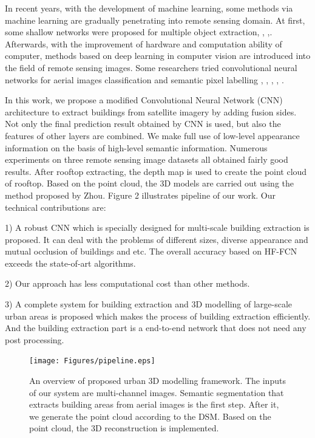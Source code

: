 In recent years, with the development of machine learning, some methods via machine learning are gradually penetrating into remote sensing domain. At first, some shallow networks were proposed for multiple object extraction\cite{IEEEexample:mnih2013machine}, \cite{IEEEexample:saito2016multiple}, \cite{IEEEexample:alshehhi2017simultaneous},\cite{IEEEexample:zhao2017contextually}. Afterwards, with the improvement of hardware and computation ability of computer, methods based on deep learning in computer vision are introduced into the field of remote sensing images. Some researchers tried convolutional neural networks for aerial images classification and semantic pixel labelling \cite{IEEEexample:paisitkriangkrai2015effective}, \cite{IEEEexample:liu2017dense}, \cite{IEEEexample:audebert2017deep}, \cite{IEEEexample:kampffmeyer2017urban}, \cite{IEEEexample:he2017multi}.\par
In this work, we propose a modified Convolutional Neural Network (CNN) architecture to extract buildings from satellite imagery by adding fusion sides. Not only the final prediction result obtained by CNN is used, but also the features of other layers are combined. We make full use of low-level appearance information on the basis of high-level semantic information. Numerous experiments on three remote sensing image datasets all obtained fairly good results. After rooftop extracting, the depth map is used to create the point cloud of rooftop. Based on the point cloud, the 3D models are carried out using the method proposed by Zhou\cite{IEEEexample:zhou20112}. Figure 2 illustrates pipeline of our work. Our technical contributions are:\par
 1) A robust CNN which is specially designed for multi-scale building extraction is proposed. It can deal with the problems of different sizes, diverse appearance and mutual occlusion of buildings and etc. The overall accuracy based on HF-FCN exceeds the state-of-art algorithms.\par
 2) Our approach has less computational cost than other methods.\par
 3) A complete system for building extraction and 3D modelling of large-scale urban areas is proposed which makes the process of building extraction efficiently. And the building extraction part is a end-to-end network that does not need any post processing.
\begin{center}
\begin{figure}
\texttt{[image: Figures/pipeline.eps]}
\caption{An overview of proposed urban 3D modelling framework. The inputs of our system are multi-channel images. Semantic segmentation that extracts building areas from aerial images is the first step. After it, we generate the point cloud according to the DSM. Based on the point cloud, the 3D reconstruction is implemented.}
\label{2}
\end{figure}
\end{center}
